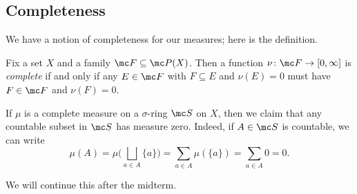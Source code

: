 \documentclass[../notes.tex]{subfiles}
\begin{document}
\subsection{Completeness}
We have a notion of completeness for our measures; here is the definition.
\begin{definition}[Compelete]
	Fix a set $X$ and a family $\mc F\subseteq\mc P(X)$. Then a function $\nu\colon\mc F\to[0,\infty]$ is \textit{complete} if and only if any $E\in\mc F$ with $F\subseteq E$ and $\nu(E)=0$ must have $F\in\mc F$ and $\nu(F)=0$.
\end{definition}
\begin{remark} \label{rem:complete-has-countable-meas-zero}
	If $\mu$ is a complete measure on a $\sigma$-ring $\mc S$ on $X$, then we claim that any countable subset in $\mc S$ has measure zero. Indeed, if $A\in\mc S$ is countable, we can write
	\[\mu(A)=\mu\Bigg(\bigsqcup_{a\in A}\{a\}\Bigg)=\sum_{a\in A}\mu(\{a\})=\sum_{a\in A}0=0.\]
\end{remark}
We will continue this after the midterm.
\end{document}
